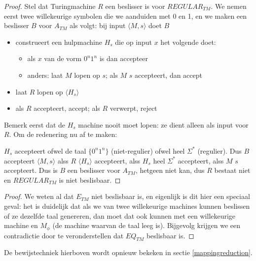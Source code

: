 \begin{proof}
Stel dat Turingmachine $R$ een beslisser is voor $REGULAR_{TM}$. We
nemen eerst twee willekeurige symbolen die we aanduiden met 0 en 1, en
we maken een beslisser $B$ voor $A_{TM}$ als volgt: bij input
$\langle M,s \rangle$ doet $B$
\begin{itemize}
\item construeert een hulpmachine $H_s$ die op input $x$ het
volgende doet:
\begin{itemize}
\item als $x$ van de vorm $0^n1^n$ is dan accepteer
\item anders: laat $M$ lopen op $s$; als $M$ $s$ accepteert, dan accept
\end{itemize}

\item laat $R$ lopen op $\langle H_s \rangle$
\item als $R$ accepteert, accept; als $R$ verwerpt, reject
\end{itemize}

Bemerk eerst dat de $H_s$ machine nooit moet lopen: ze dient alleen
als input voor $R$. Om de redenering nu af te maken:


$H_s$ accepteert ofwel de taal $\{0^n1^n\}$ (niet-regulier) ofwel heel
$\Sigma^*$ (regulier). Dus $B$ accepteert $\langle M,s \rangle$ alss $R$ $\langle H_s \rangle$
accepteert, alss $H_s$ heel $\Sigma^*$ accepteert, alss $M$ $s$
accepteert. Dus is $B$ een beslisser voor $A_{TM}$, hetgeen niet kan,
dus $R$ bestaat niet en $REGULAR_{TM}$ is niet beslisbaar.
\end{proof}


\begin{proof}
We weten al dat $E_{TM}$ niet beslisbaar is, en eigenlijk is dit hier
een speciaal geval: het is duidelijk dat als we van twee willekeurige
machines kunnen beslissen of ze dezelfde taal genereren, dan moet dat
ook kunnen met een willekeurige machine en $M_\phi$ (de machine
waarvan de taal leeg is). Bijgevolg krijgen we een contradictie door
te veronderstellen dat $EQ_{TM}$ beslisbaar is.
\end{proof}


De bewijstechniek hierboven wordt opnieuw bekeken in sectie
\ref{mappingreduction}.

